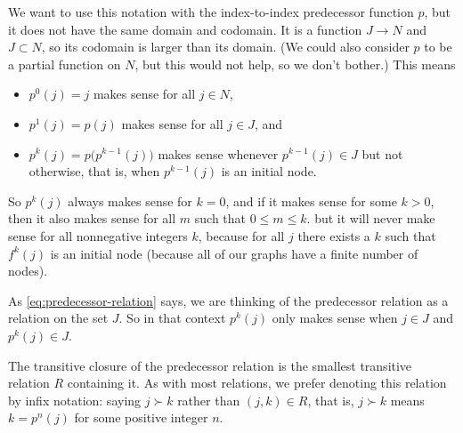 We want to use this notation with the index-to-index predecessor function
$p$, but it does not have the same domain and codomain.  It is a function
$J \to N$ and $J \subset N$, so its codomain is larger than its domain.
(We could also consider $p$ to be a partial function on $N$, but this would
not help, so we don't bother.)  This means
\begin{itemize}
\item $p^0(j) = j$ makes sense for all $j \in N$,
\item $p^1(j) = p(j)$ makes sense for all $j \in J$, and
\item $p^k(j) = p\bigl(p^{k - 1}(j)\bigr)$ makes sense whenever
    $p^{k - 1}(j) \in J$ but not otherwise, that is, when
    $p^{k - 1}(j)$ is an initial node.
\end{itemize}
So $p^k(j)$ always makes sense for $k = 0$, and if it makes sense for
some $k > 0$, then it also makes sense for all $m$ such that $0 \le m \le k$.
but it will never make sense for all nonnegative integers $k$, because
for all $j$ there exists a $k$ such that $f^k(j)$ is an initial node
(because all of our graphs have a finite number of nodes).

As \eqref{eq:predecessor-relation} says,
we are thinking of the predecessor relation as a relation on the set $J$.
So in that context $p^k(j)$ only makes sense when $j \in J$ and $p^k(j) \in J$.

The transitive closure of the predecessor relation
is the smallest transitive relation $R$ containing it.
As with most relations, we prefer denoting this relation by infix notation:
saying $j \succ k$ rather than $(j, k) \in R$, that is, $j \succ k$ means
$k = p^n(j)$ for some positive integer $n$.

